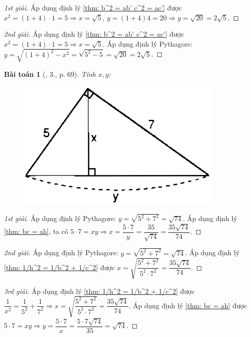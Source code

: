 \documentclass{article}
\newtheorem{baitoan}{Bài toán}
\begin{document}
\begin{proof}[1st giải]
	Áp dụng định lý \ref{thm: b^2 = ab' c^2 = ac'} được $x^2 = (1 + 4)\cdot1 = 5\Rightarrow x = \sqrt{5}$, $y = (1 + 4)4 = 20\Rightarrow y = \sqrt{20} = 2\sqrt{5}$.
\end{proof}

\begin{proof}[2nd giải]
	Áp dụng định lý \ref{thm: b^2 = ab' c^2 = ac'} được $x^2 = (1 + 4)\cdot1 = 5\Rightarrow x = \sqrt{5}$. Áp dụng định lý Pythagore: $y = \sqrt{(1 + 4)^2 - x^2} = \sqrt{5^2 - 5} = \sqrt{20} = 2\sqrt{5}$.
\end{proof}

\begin{baitoan}[\cite{SGK_Toan_9_tap_1}, 3., p. 69]
	Tính $x,y$:
	\begin{figure}[H]
		\centering
		\includegraphics[scale=.25]{SGK_Toan_9_6_p69}
	\end{figure}
\end{baitoan}

\begin{proof}[1st giải]
	Áp dụng định lý Pythagore: $y = \sqrt{5^2 + 7^2} = \sqrt{74}$. Áp dụng định lý \ref{thm: bc = ah}, ta có $5\cdot7 = xy\Rightarrow x = \dfrac{5\cdot7}{y} = \dfrac{35}{\sqrt{74}} = \dfrac{35\sqrt{74}}{74}$.
\end{proof}

\begin{proof}[2nd giải]
	Áp dụng định lý Pythagore: $y = \sqrt{5^2 + 7^2} = \sqrt{74}$. Áp dụng định lý \ref{thm: 1/h^2 = 1/b^2 + 1/c^2} được $x = \sqrt{\dfrac{5^2 + 7^2}{5^2\cdot7^2}} = \dfrac{35\sqrt{74}}{74}$.
\end{proof}

\begin{proof}[3rd giải]
	Áp dụng định lý \ref{thm: 1/h^2 = 1/b^2 + 1/c^2} được $\dfrac{1}{x^2} = \dfrac{1}{5^2} + \dfrac{1}{7^2}\Rightarrow x = \sqrt{\dfrac{5^2 + 7^2}{5^2\cdot7^2}} = \dfrac{35\sqrt{74}}{74}$. Áp dụng định lý \ref{thm: bc = ah} được $5\cdot7 = xy\Rightarrow y = \dfrac{5\cdot7}{x} = \dfrac{5\cdot7\sqrt{74}}{35} = \sqrt{74}$.
\end{proof}
\end{document}
